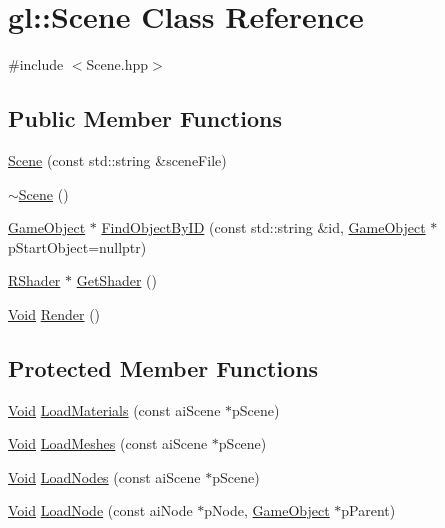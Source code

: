 \hypertarget{classgl_1_1_scene}{\section{gl\-:\-:Scene Class Reference}
\label{classgl_1_1_scene}
}


{\ttfamily \#include $<$Scene.\-hpp$>$}

\subsection*{Public Member Functions}
\begin{DoxyCompactItemize}
\item 
\hyperlink{classgl_1_1_scene_a20c2bb328c15cc78c5ee9871f8f2533e}{Scene} (const std\-::string \&scene\-File)
\item 
\hyperlink{classgl_1_1_scene_a6ab424422c62cfcae8f9d27568902c89}{$\sim$\-Scene} ()
\item 
\hyperlink{classgl_1_1_game_object}{Game\-Object} $\ast$ \hyperlink{classgl_1_1_scene_a795f1b5059282e416b3ac320df2f6e6b}{Find\-Object\-By\-I\-D} (const std\-::string \&id, \hyperlink{classgl_1_1_game_object}{Game\-Object} $\ast$p\-Start\-Object=nullptr)
\item 
\hyperlink{classgl_1_1_r_shader}{R\-Shader} $\ast$ \hyperlink{classgl_1_1_scene_a67891131153f1b2c47af90743fbc854c}{Get\-Shader} ()
\item 
\hyperlink{_basic_types_8hpp_afdf0f22c576e6ee1b982f64b839c4bea}{Void} \hyperlink{classgl_1_1_scene_a90a883380627b976bebfacc5cc4a24ac}{Render} ()
\end{DoxyCompactItemize}
\subsection*{Protected Member Functions}
\begin{DoxyCompactItemize}
\item 
\hyperlink{_basic_types_8hpp_afdf0f22c576e6ee1b982f64b839c4bea}{Void} \hyperlink{classgl_1_1_scene_abe710b6eb4fcb56b72e4251b30cc007c}{Load\-Materials} (const ai\-Scene $\ast$p\-Scene)
\item 
\hyperlink{_basic_types_8hpp_afdf0f22c576e6ee1b982f64b839c4bea}{Void} \hyperlink{classgl_1_1_scene_aa628ca64f9efc796c5a0977e3db23b1c}{Load\-Meshes} (const ai\-Scene $\ast$p\-Scene)
\item 
\hyperlink{_basic_types_8hpp_afdf0f22c576e6ee1b982f64b839c4bea}{Void} \hyperlink{classgl_1_1_scene_a192e408ea2a6965aab0e8ec1d3923158}{Load\-Nodes} (const ai\-Scene $\ast$p\-Scene)
\item 
\hyperlink{_basic_types_8hpp_afdf0f22c576e6ee1b982f64b839c4bea}{Void} \hyperlink{classgl_1_1_scene_aa1a68b256316296663b03acbba910c6f}{Load\-Node} (const ai\-Node $\ast$p\-Node, \hyperlink{classgl_1_1_game_object}{Game\-Object} $\ast$p\-Parent)
\end{DoxyCompactItemize}
